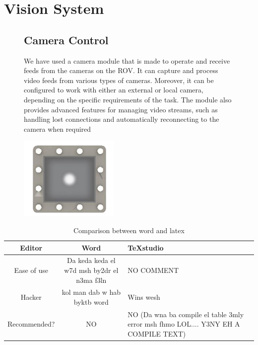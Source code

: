 \documentclass[a4paper,10pt]{article}
\begin{document}
	\section{Vision System}
	\begin{figure}[H]
		\begin{minipage}{0.7\textwidth}
			\subsection*{Camera Control}
			We have used a camera module that is made to operate and receive feeds 
			from the cameras on the ROV. It can capture and process video feeds from 
			various types of cameras. Moreover, it can be configured to work with either 
			an external or local camera, depending on the specific requirements of the 
			task. The module also provides advanced features for managing video 
			streams, such as handling lost connections and automatically 
			reconnecting to the camera when required
		\end{minipage}
		\hfill
		\begin{minipage}{0.2\textwidth}
			\centering
			\includegraphics[width=\textwidth]{main_camera}
		\end{minipage}
	\end{figure}
	
	\begin{table}[H]
		\centering
		\caption{Comparison between word and latex}
		\begin{tabular}{|c|c||p{5cm}|}
			\hline
			Editor & Word & TeXstudio \\
			\hline
			Ease of use & Da keda keda el w7d msh by2dr el n3ma f3ln & NO COMMENT \\ \hline
			Hacker & kol man dab w hab byktb word & Wins wesh \\ \hline
			Recommended? & NO & NO (Da wna ba compile el table 3mly error msh fhmo LOL.... Y3NY EH A COMPILE TEXT) \\ 
			\hline
		\end{tabular}
	\end{table}
	
\end{document}
